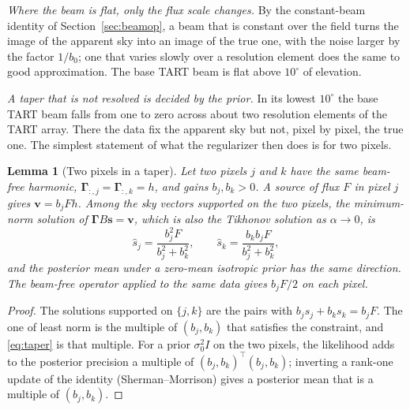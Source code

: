 \documentclass[11pt,a4paper]{article}
\newtheorem{lemma}{Lemma}
\newcommand{\Gammam}{\boldsymbol{\Gamma}}
\newcommand{\svec}{\boldsymbol{s}}
\newcommand{\vvec}{\boldsymbol{v}}
\newcommand{\Gammab}{\Gammam B}
\begin{document}
\emph{Where the beam is flat, only the flux scale changes.} By the
constant-beam identity of Section~\ref{sec:beamop}, a beam that is constant
over the field turns the image of the apparent sky into an image of the true
one, with the noise larger by the factor $1/b_0$; one that varies slowly
over a resolution element does the same to good approximation. The base TART
beam is flat above $10^{\circ}$ of elevation.

\emph{A taper that is not resolved is decided by the prior.} In its lowest
$10^{\circ}$ the base TART beam falls from one to zero across about two
resolution elements of the TART array. There the data fix the apparent sky
but not, pixel by pixel, the true one. The simplest statement of what the
regularizer then does is for two pixels.

\begin{lemma}[Two pixels in a taper]
\label{lem:taper}
Let two pixels $j$ and $k$ have the same beam-free harmonic,
$\Gammam_{:,j}=\Gammam_{:,k}=h$, and gains $b_j,b_k>0$. A source of flux $F$
in pixel $j$ gives $\vvec=b_jFh$. Among the sky vectors supported on the two
pixels, the minimum-norm solution of $\Gammab\svec=\vvec$, which is also the
Tikhonov solution as $\alpha\to0$, is
\begin{equation}
  \label{eq:taper}
  \hat{s}_j=\frac{b_j^{2}F}{b_j^{2}+b_k^{2}},\qquad
  \hat{s}_k=\frac{b_kb_jF}{b_j^{2}+b_k^{2}},
\end{equation}
and the posterior mean under a zero-mean isotropic prior has the same
direction. The beam-free operator applied to the same data gives $b_jF/2$ on
each pixel.
\end{lemma}

\begin{proof}
The solutions supported on $\{j,k\}$ are the pairs with
$b_js_j+b_ks_k=b_jF$. The one of least norm is the multiple of $(b_j,b_k)$
that satisfies the constraint, and \eqref{eq:taper} is that multiple. For a
prior $\sigma_0^{2}I$ on the two pixels, the likelihood adds to the
posterior precision a multiple of $(b_j,b_k)^{\!\top}(b_j,b_k)$; inverting a
rank-one update of the identity (Sherman--Morrison) gives a posterior mean
that is a multiple of $(b_j,b_k)$.
\end{proof}
\end{document}
